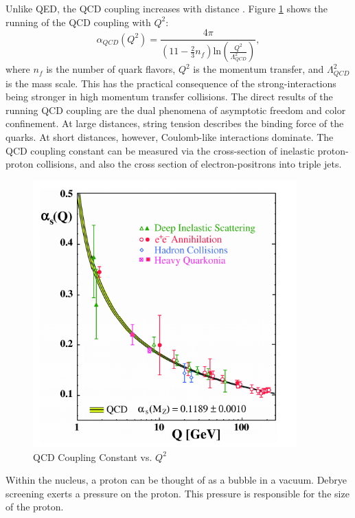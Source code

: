 Unlike QED, the QCD coupling increases with distance \cite{Bethke:2006ac}. Figure \ref{fig:runningQCDCoupling} shows the running of the QCD coupling with $Q^2$:
\begin{equation}
\alpha_{QCD}(Q^2) = \frac{4 \pi }{(11 - \frac{2}{3}n_f)\mathrm{ln}(\frac{Q^2}{\Lambda^2_{QCD}}) } ,
\end{equation}
where $n_f$ is the number of quark flavors, $Q^2$ is the momentum transfer, and  $\Lambda^2_{QCD}$ is the mass scale. 
This has the practical consequence of the strong-interactions being stronger in high momentum transfer collisions. The direct results of the running QCD coupling are the dual phenomena of asymptotic freedom and color confinement. At large distances, string tension describes the binding force of the quarks. At short distances, however, Coulomb-like interactions dominate. The QCD coupling constant can be measured via the cross-section of inelastic proton-proton collisions, and also the cross section of electron-positrons into triple jets. 
\begin{figure}[h!]
\begin{centering}
\includegraphics[width=4in]{Chapter1/importfigs/qcd_coupling_bethke.png}
\par\end{centering}
\caption{QCD Coupling Constant vs. $Q^2$ \cite{Bethke:2006ac} \label{fig:runningQCDCoupling}}
\end{figure}

Within the nucleus, a proton can be thought of as a bubble in a vacuum. Debrye screening exerts a pressure on the proton. This pressure is responsible for the size of the proton.

